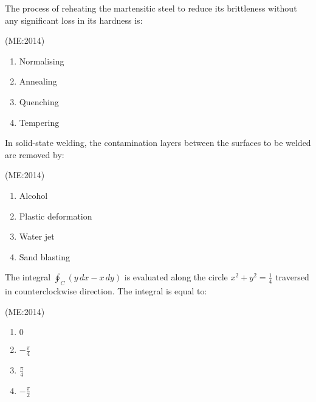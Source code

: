     \item
	    The process of reheating the martensitic steel to reduce its brittleness without any significant loss in its hardness is: 

	    \hfill{(ME:2014)}
    \begin{multicols}{4}
    \begin{enumerate}
        \item Normalising
        \item Annealing
        \item Quenching
        \item Tempering
    \end{enumerate}
    \end{multicols}

    \item In solid-state welding, the contamination layers between the surfaces to be welded are removed by:

	    \hfill{(ME:2014)}
    \begin{multicols}{4}
    \begin{enumerate}
        \item Alcohol
        \item Plastic deformation
        \item Water jet
        \item Sand blasting
    \end{enumerate}
    \end{multicols}

    \item The integral $\oint_C (y \, dx - x \, dy)$ is evaluated along the circle $x^2 + y^2 = \frac{1}{4}$ traversed in counterclockwise direction. The integral is equal to: 

	    \hfill{(ME:2014)}
    \begin{multicols}{4}
    \begin{enumerate}
        \item $0$
	\item $-\frac{\pi}{4}$
	\item $\frac{ \pi}{4}$
	\item $-\frac{ \pi}{2}$
    \end{enumerate}
    \end{multicols}


